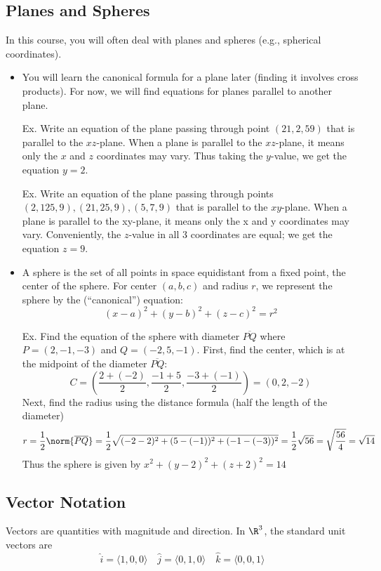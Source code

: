 \documentclass[]{mangos-musings}
\begin{document}
\subsection*{Planes and Spheres}
In this course, you will often deal with planes and spheres (e.g., spherical coordinates). 
\begin{itemize}
  \item You will learn the canonical formula for a plane later (finding it involves cross products). For now, we will find equations for planes parallel to another plane.
  \item[Ex.] Write an equation of the plane passing through point $(21, 2, 59)$ that is parallel to the $xz$-plane.
  \subitem When a plane is parallel to the $xz$-plane, it means only the $x$ and $z$ coordinates may vary. 
  \subitem Thus taking the $y$-value, we get the equation $y = 2$.
  \item[Ex.] Write an equation of the plane passing through points $(2, 125, 9), (21, 25, 9), (5, 7, 9)$ that is parallel to the $xy$-plane. 
  \subitem When a plane is parallel to the xy-plane, it means only the x and y coordinates may vary. 
  \subitem Conveniently, the $z$-value in all 3 coordinates are equal; we get the equation $z = 9$.
  \item A sphere is the set of all points in space equidistant from a fixed point, the center of
  the sphere. For center $(a, b, c)$ and radius $r$, we represent the sphere by the (``canonical'') equation: 
  \[(x-a)^2 + (y-b)^2 + (z-c)^2 = r^2\]
  \item[Ex.] Find the equation of the sphere with diameter $\overline{PQ}$ where $P = (2, -1, -3)$ and $Q = (-2, 5, -1)$.
  \subitem First, find the center, which is at the midpoint of the diameter $\overline{PQ}$:
  \[C = \left(\dfrac{2 + (-2)}{2}, \dfrac{-1 + 5}{2}, \dfrac{-3 + (-1)}{2}\right) = \left(0, 2, -2\right)\]
  \subitem Next, find the radius using the distance formula (half the length of the diameter)
  \[r = \dfrac{1}{2}\norm{\overline{PQ}} 
      = \dfrac{1}{2}\sqrt{(-2 - 2)^2 + (5 - (-1))^2 + (-1 - (-3))^2}
      = \dfrac{1}{2}\sqrt{56}
      = \sqrt{\dfrac{56}{4}}
      = \sqrt{14}\]
  \subitem Thus the sphere is given by $x^2 + (y-2)^2 + (z+2)^2 = 14$
\end{itemize}
\subsection*{Vector Notation}
Vectors are quantities with magnitude and direction. In $\R^3$, the standard unit vectors are 
\[\hat{i} = \langle1, 0, 0\rangle \quad \hat{j} = \langle0, 1, 0\rangle \quad \hat{k} = \langle0, 0, 1\rangle \]
\end{document}
